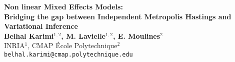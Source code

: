 \documentclass[a0,portrait]{a0poster}
\begin{document}


\begin{minipage}[b]{0.75\linewidth}
\veryHuge \color{Navy} \textbf{Non linear Mixed Effects Models:\\
Bridging the gap between Independent Metropolis Hastings and Variational Inference} \color{Black}\\[2cm] %
\huge \textbf{Belhal Karimi$^{1,2}$, M. Lavielle$^{1,2}$, E. Moulines$^{2}$}\\[0.5cm] %
\huge INRIA$^1$, CMAP École Polytechnique$^2$\\[0.4cm] %
\Large \texttt{belhal.karimi@cmap.polytechnique.edu}\\
\end{minipage}
%
\begin{minipage}[b]{0.25\linewidth}

\begin{center}
\end{center}
\end{minipage}

\vspace{1cm} %

\end{document}
